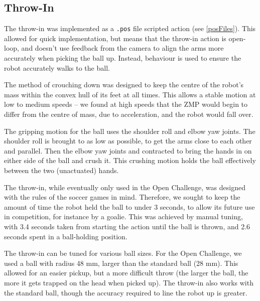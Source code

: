 \documentclass[pdftex,11pt,a4paper]{report}
\begin{document}
\subsection{Throw-In}
The throw-in was implemented as a \texttt{.pos} file scripted action (see
\autoref{posFiles}). This allowed for quick implementation, but means
that the throw-in action is open-loop, and doesn't use feedback from the
camera to align the arms more accurately when picking the ball up. Instead,
behaviour is used to ensure the robot accurately walks to the ball.

The method of crouching down was designed to keep the centre of the robot's
mass within the convex hull of its feet at all times. This allows a stable
motion at low to medium speeds -- we found at high speeds that the ZMP
would begin to differ from the centre of mass, due to acceleration, and the
robot would fall over.

The gripping motion for the ball uses the shoulder roll and elbow yaw
joints. The shoulder roll is brought to as low as possible, to get the arms
close to each other and parallel. Then the elbow yaw joints and contracted
to bring the hands in on either side of the ball and crush it. This
crushing motion holds the ball effectively between the two (unactuated)
hands.

The throw-in, while eventually only used in the Open Challenge, was
designed with the rules of the soccer games in mind. Therefore, we sought
to keep the amount of time the robot held the ball to under 3 seconds, to
allow its future use in competition, for instance by a goalie. This was
achieved by manual tuning, with 3.4 seconds taken from starting the action
until the ball is thrown, and 2.6 seconds spent in a ball-holding position.

The throw-in can be tuned for various ball sizes. For the Open Challenge,
we used a ball with radius 48 mm, larger than the standard ball (28 mm).
This allowed for an easier pickup, but a more difficult throw (the larger
the ball, the more it gets trapped on the head when picked up). The
throw-in also works with the standard ball, though the accuracy required to
line the robot up is greater.
\end{document}
